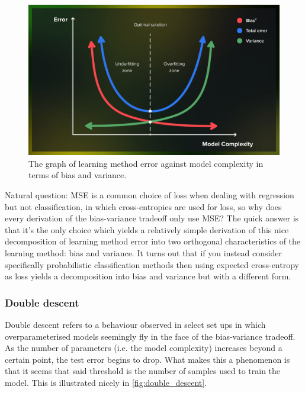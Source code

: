 \documentclass[11pt]{article}
\begin{document}
\begin{figure}[t]
    \centering
    \includegraphics[width=\columnwidth]{./figures/supervised_learning/bias_variance.png}
    \caption{The graph of learning method error against model complexity in terms of bias and variance. }
    \label{fig:bias_variance}
\end{figure}

\begin{tcolorbox}[title={\centering\textbf{Beyond MSE}}, colback=myLightBlue, colbacktitle=myDarkBlue, colframe=myDarkBlue, coltitle=white]
    Natural question: MSE is a common choice of loss when dealing with regression but not classification, in which cross-entropies are used for loss, so why does every derivation of the bias-variance tradeoff only use MSE? The quick answer is that it's the only choice which yields a relatively simple derivation of this nice decomposition of learning method error into two orthogonal characteristics of the learning method: bias and variance. It turns out that if you instead consider specifically probabilistic classification methods then using expected cross-entropy as loss yields a decomposition into bias and variance but with a different form.
\end{tcolorbox}

\subsubsection{Double descent}
Double descent refers to a behaviour observed in select set ups in which overparameterised models seemingly fly in the face of the bias-variance tradeoff. As the number of parameters (i.e. the model complexity) increases beyond a certain point, the test error begins to drop. What makes this a phenomenon is that it seems that said threshold is the number of samples used to train the model. This is illustrated nicely in \autoref{fig:double_descent}.
\end{document}
